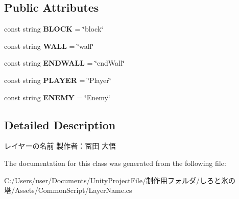\subsection*{Public Attributes}
\begin{DoxyCompactItemize}
\item 
\mbox{\label{class_layer_name_a76b4a35a02177cf132d9265145e82102}} 
const string {\bfseries B\+L\+O\+CK} = \char`\"{}block\char`\"{}
\item 
\mbox{\label{class_layer_name_acd05965cafaac571e9919048fdcebb22}} 
const string {\bfseries W\+A\+LL} = \char`\"{}wall\char`\"{}
\item 
\mbox{\label{class_layer_name_a7ff33d2d4733e8df95726cd2f71b74e0}} 
const string {\bfseries E\+N\+D\+W\+A\+LL} = \char`\"{}end\+Wall\char`\"{}
\item 
\mbox{\label{class_layer_name_a90d2a90c27644a03b23e9a208c87d19c}} 
const string {\bfseries P\+L\+A\+Y\+ER} = \char`\"{}Player\char`\"{}
\item 
\mbox{\label{class_layer_name_a7ae57b40b06fa1472207b3b625a1a42d}} 
const string {\bfseries E\+N\+E\+MY} = \char`\"{}Enemy\char`\"{}
\end{DoxyCompactItemize}


\subsection{Detailed Description}
レイヤーの名前 製作者：冨田 大悟 



The documentation for this class was generated from the following file\+:\begin{DoxyCompactItemize}
\item 
C\+:/\+Users/user/\+Documents/\+Unity\+Project\+File/制作用フォルダ/しろと氷の塔/\+Assets/\+Common\+Script/Layer\+Name.\+cs\end{DoxyCompactItemize}
